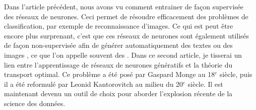 Dans l'article précédent, nous avons vu comment entrainer de façon supervisée des réseaux de neurones. Ceci permet de résoudre efficacement des problèmes de classification, par exemple de reconnaissance d'images.  
%
Ce qui est peut être encore plus surprenant, c'est que ces réseaux de neurones sont également utilisés de façon non-supervisée afin de générer automatiquement des textes ou des images , ce que l'on appelle souvent des .
%
Dans ce second article, je tisserai un lien entre l'apprentissage de réseaux de neurones génératifs et la théorie du transport optimal. Ce problème a été posé par Gaspard Monge au 18$^e$ siècle, puis il a été reformulé par Leonid Kantorovitch au milieu du 20$^e$ siècle. Il est maintenant devenu un outil de choix pour aborder l'explosion récente de la science des données. 
%
% 
